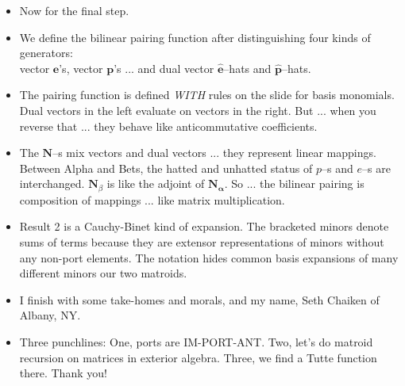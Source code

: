 \documentclass[14pt]{extarticle}
\begin{document}
{\begin{itemize}
\item Now for the final step.

\item
  We define the bilinear pairing function 
  after distinguishing  
  four kinds of generators:\\
  vector $\mathbf{e}$'s, vector $\mathbf{p}$'s ... and
dual vector $\widehat{\mathbf{e}}$--hats and $\widehat{\mathbf{p}}$--hats.  

\item
  The pairing function is defined \emph{WITH} rules on the slide for basis monomials.  Dual vectors
  in the left evaluate on vectors in the right.   But ... when you reverse that ... 
  they behave like anticommutative coefficients.

\item
  The $\mathbf{N}$--s mix vectors and dual vectors ... they represent linear mappings.
  Between Alpha and Bets, the hatted and unhatted status of $p$--s and $e$--s are interchanged.
  $\mathbf{N}_\beta$ is like the adjoint of $\mathbf{N_\alpha}$.  So ... the
  bilinear pairing is composition of mappings  ... like matrix multiplication.

\item
  Result 2 is a Cauchy-Binet kind of expansion. The bracketed minors denote sums of terms
  because they are extensor representations of minors without any non-port elements.
  The notation hides common basis expansions of many different minors our two matroids.


\item
  I finish with some take-homes and morals, and my name, Seth Chaiken
  of Albany, NY.

  \item
  Three punchlines:  One, ports are IM-PORT-ANT.
  Two, let's do matroid recursion on matrices in exterior algebra.
  Three, we find a Tutte function there.
  Thank you!
  \end{itemize}
}
\end{document}
